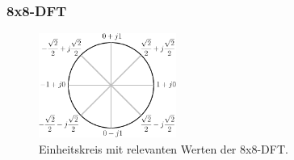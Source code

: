 \begin{frame}\frametitle{8x8-DFT}
   \begin{figure}[!h]
  \centering
  \includegraphics[width=0.4\textwidth]{img/Einheitskreis-crop.pdf}
  \caption{Einheitskreis mit relevanten Werten der 8x8-DFT.}
  \label{pic:Einheitskreis_Faktoren}
\end{figure}

 \begin{minipage}{0.9\textwidth}
\begingroup
 \renewcommand*{\arraystretch}{0.95} %


\end{minipage}
\end{frame}

